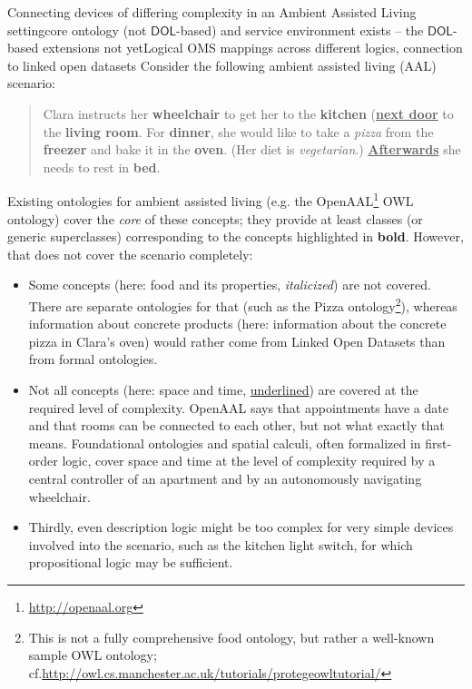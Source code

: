 \documentclass[10pt,fleqn,final]{scrreprt}
\makeatletter
\newcommand*{\cf}{cf.\@\xspace}
\newcommand*{\eg}{e.g.\@\xspace}
\newcommand*{\DOL}{\ensuremath{\mathsf{DOL}}\xspace}
\makeatother
\begin{document}
\begin{usecase}{Connecting devices of differing complexity in an Ambient Assisted Living setting}{core ontology (not \DOL-based) and service environment exists – the \DOL-based extensions not yet}{Logical OMS mappings across different logics, connection to linked open datasets}
  Consider the following ambient assisted living (AAL) scenario:
  \begin{quote}
    Clara instructs her \textbf{wheelchair} to get her to the \textbf{kitchen} (\textbf{\underline{next door}} to the \textbf{living room}.  For \textbf{dinner}, she would like to take a \textit{pizza} from the \textbf{freezer} and bake it in the \textbf{oven}.  (Her diet is \textit{vegetarian}.)  \textbf{\underline{Afterwards}} she needs to rest in \textbf{bed}.
  \end{quote}
  Existing ontologies for ambient assisted living (\eg the OpenAAL\footnote{\url{http://openaal.org}} OWL ontology) cover the \emph{core} of these  concepts; they provide at least classes (or generic superclasses) corresponding to the concepts highlighted in \textbf{bold}.  However, that does not cover the scenario completely:
  \begin{itemize}
  \item Some concepts (here: food and its properties, \textit{italicized}) are not covered.  There are separate ontologies for that (such as the Pizza ontology\footnote{This is not a fully comprehensive food ontology, but rather a well-known sample OWL ontology; \cf \url{http://owl.cs.manchester.ac.uk/tutorials/protegeowltutorial/}}), whereas information about concrete products (here: information about the concrete pizza in Clara's oven) would rather come from Linked Open Datasets than from formal ontologies.
  \item Not all concepts (here: space and time, \underline{underlined}) are covered at the required level of complexity.  OpenAAL says that appointments have a date and that rooms can be connected to each other, but not what exactly that means.  Foundational ontologies and spatial calculi, often formalized in first-order logic, cover space and time at the level of complexity required by a central controller of an apartment and by an autonomously navigating wheelchair.
  \item Thirdly, even description logic might be too complex for very simple devices involved into the scenario, such as the kitchen light switch, for which propositional logic may be sufficient.
  \end{itemize}

\end{usecase}
\end{document}
